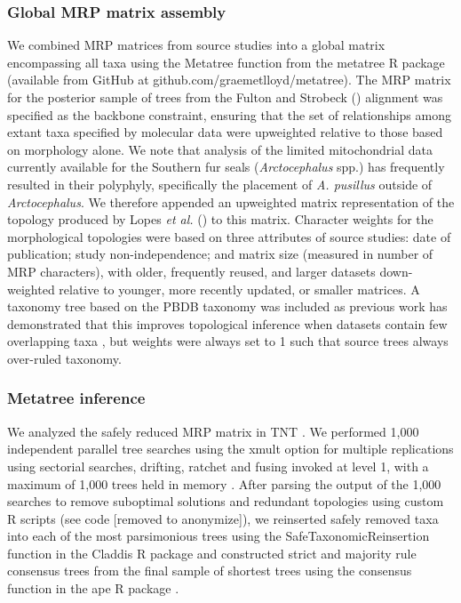 \documentclass[a4paper, 12pt]{article}
\begin{document}
\subsubsection{Global MRP matrix assembly} 

We combined MRP matrices from source studies into a global matrix encompassing all taxa using the Metatree function from the metatree R package (available from GitHub at github.com/graemetlloyd/metatree). The MRP matrix for the posterior sample of trees from the Fulton and Strobeck (\citeyear{fulton2010multiple}) alignment was specified as the backbone constraint, ensuring that the set of relationships among extant taxa specified by molecular data were upweighted relative to those based on morphology alone. We note that analysis of the limited mitochondrial data currently available for the Southern fur seals (\textit{Arctocephalus} spp.) has frequently resulted in their polyphyly, specifically the placement of \textit{A. pusillus} outside of \textit{Arctocephalus}. We therefore appended an upweighted matrix representation of the topology produced by Lopes \textit{et al.} (\citeyear{lopes2021phylogenomic}) to this matrix. Character weights for the morphological topologies were based on three attributes of source studies: date of publication; study non-independence; and matrix size (measured in number of MRP characters), with older, frequently reused, and larger datasets down-weighted relative to younger, more recently updated, or smaller matrices. A taxonomy tree based on the PBDB taxonomy was included as previous work has demonstrated that this improves topological inference when datasets contain few overlapping taxa \citep{lloyd2021total}, but weights were always set to 1 such that source trees always over-ruled taxonomy.

\subsubsection{Metatree inference} 

We analyzed the safely reduced MRP matrix in TNT \citep{goloboff2008tnt}. We performed 1,000 independent parallel tree searches using the xmult option for multiple replications using sectorial searches, drifting, ratchet and fusing invoked at level 1, with a maximum of 1,000 trees held in memory \citep{goloboff2008tnt}. After parsing the output of the 1,000 searches to remove suboptimal solutions and redundant topologies using custom R scripts (see code [removed to anonymize]), we reinserted safely removed taxa into each of the most parsimonious trees using the SafeTaxonomicReinsertion function in the Claddis R package \citep{lloyd2016probabilistic} and constructed strict and majority rule consensus trees from the final sample of shortest trees using the consensus function in the ape R package \citep{paradis2019ape}.
\end{document}
